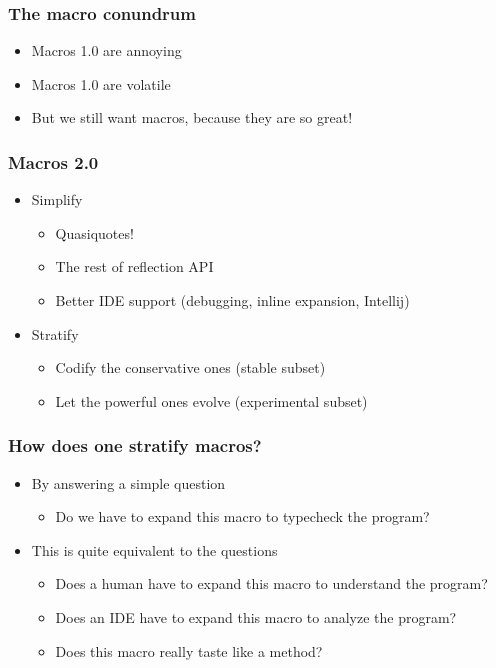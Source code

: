 \documentclass[svgnames,hyperref={bookmarks=false}]{beamer}
\begin{document}
\begin{frame}[fragile]
\frametitle{The macro conundrum}

\begin{itemize}
\item Macros 1.0 are annoying
\item Macros 1.0 are volatile
\item But we still want macros, because they are so great!
\end{itemize}
\end{frame}

\begin{frame}[fragile]
\frametitle{Macros 2.0}

\begin{itemize}
\pause
\item Simplify
\begin{itemize}
\item Quasiquotes!
\item The rest of reflection API
\item Better IDE support (debugging, inline expansion, Intellij)
\end{itemize}
\pause
\vskip15pt
\item Stratify
\begin{itemize}
\item Codify the conservative ones (stable subset)
\item Let the powerful ones evolve (experimental subset)
\end{itemize}
\end{itemize}
\end{frame}

\begin{frame}[fragile]
\frametitle{How does one stratify macros?}

\begin{itemize}
\item By answering a simple question
\begin{itemize}
\item Do we have to expand this macro to typecheck the program?
\end{itemize}

\vskip20pt
\item This is quite equivalent to the questions
\begin{itemize}
\item Does a human have to expand this macro to understand the program?
\item Does an IDE have to expand this macro to analyze the program?
\item Does this macro really taste like a method?
\end{itemize}
\end{itemize}
\end{frame}
\end{document}
